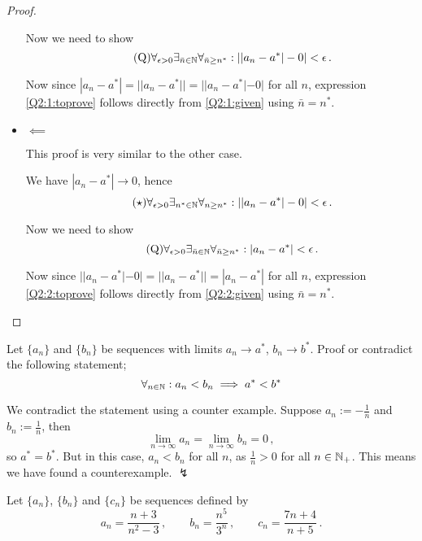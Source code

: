 \documentclass[week=2]{homework}
\begin{document}
\begin{questions}
\begin{proof}
\begin{itemize}
	    		Now we need to show
	    		\begin{equation} \label{Q2:1:toprove} \tag{Q}
		    		\forall_{\epsilon > 0}\exists_{\bar n \in \naturals}\forall_{\bar n \geq n^*}: ||a_n - a^*|-0| < \epsilon\,.
	    		\end{equation}
	    		
	    		Now since $|a_n - a^*| = ||a_n - a^*|| = ||a_n - a^*|-0|$ for all $n$, expression \ref{Q2:1:toprove} follows directly from \ref{Q2:1:given} using $\bar n = n^*$.
	    		
	    		\item $\impliedby$
	    		
	    		This proof is very similar to the other case.
	    		
	    		We have $|a_n-a^*| \to 0$, hence
	    		\begin{equation} \label{Q2:2:given} \tag{$\star$}
	    		\forall_{\epsilon > 0}\exists_{n^* \in \naturals}\forall_{n \geq n^*}: ||a_n - a^*|-0| < \epsilon\,.
	    		\end{equation}
	    		
	    		Now we need to show
	    		\begin{equation} \label{Q2:2:toprove} \tag{Q}
	    		\forall_{\epsilon > 0}\exists_{\bar n \in \naturals}\forall_{\bar n \geq n^*}: |a_n - a^*| < \epsilon\,.
	    		\end{equation}
	    		
	    		Now since $||a_n - a^*|-0| = ||a_n - a^*|| = |a_n - a^*|$ for all $n$, expression \ref{Q2:2:toprove} follows directly from \ref{Q2:2:given} using $\bar n = n^*$.
	    	\end{itemize}
	    \end{proof}
    
	    \question
	    Let $\{a_n\}$ and $\{b_n\}$ be sequences with limits $a_n \to a^*$, $b_n \to b^*$.
	    Proof or contradict the following statement;
	    \[
		    \forall_{n \in \mathbb{N}}: a_n < b_n \implies a^* < b^*
	    \]
	    
	    We contradict the statement using a counter example. Suppose $a_n := -\frac{1}{n}$ and $b_n := \frac{1}{n}$, then
	    \[
		    \lim_{n\to\infty} a_n = \lim_{n\to\infty} b_n = 0\,,
	    \]
	    so $a^* = b^*$. But in this case, $a_n < b_n$ for all $n$, as $\frac{1}{n} > 0$ for all $n \in \mathbb{N}_+$. This means we have found a counterexample. $\lightning$
	    
	    \question
	    Let $\{a_n\}$, $\{b_n\}$ and $\{c_n\}$ be sequences defined by
	    \[
		    a_n = \frac{n+3}{n^2-3}\,,\qquad b_n = \frac{n^5}{3^n}\,,\qquad c_n = \frac{7n+4}{n+5}\,.
	    \]
	    

\end{questions}
\end{document}
